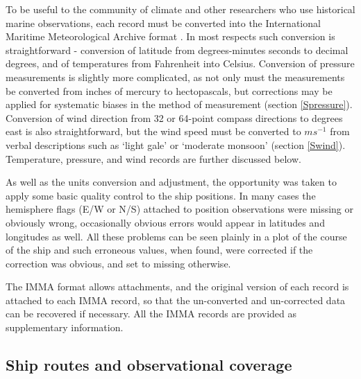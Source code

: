 \documentclass[CP]{copernicus}
\begin{document}
To be useful to the community of climate and other researchers who use historical marine observations, each record must be converted into the International Maritime Meteorological Archive format \citep{woodruff07imma}. In most respects such conversion is straightforward - conversion of latitude from degrees-minutes seconds to decimal degrees, and of temperatures from Fahrenheit into Celsius. Conversion of pressure measurements is slightly more complicated, as not only must the measurements be converted from inches of mercury to hectopascals, but corrections may be applied for systematic biases in the method of measurement (section \ref{Spressure}). Conversion of wind direction from 32 or 64-point compass directions to degrees east is also straightforward, but the wind speed must be converted to $ms^{-1}$ from verbal descriptions such as `light gale' or `moderate monsoon' (section \ref{Swind}). Temperature, pressure, and wind records are further discussed below.

As well as the units conversion and adjustment, the opportunity was taken to apply some basic quality control to the ship positions. In many cases the hemisphere flags (E/W or N/S) attached to position observations were missing or obviously wrong, occasionally obvious errors would appear in latitudes and longitudes as well. All these problems can be seen plainly in a plot of the course of the ship and such erroneous values, when found, were corrected if the correction was obvious, and set to missing otherwise. 

The IMMA format allows attachments, and the original version of each record is attached to each IMMA record, so that the un-converted and un-corrected data can be recovered if necessary. All the IMMA records are provided as supplementary information.

\subsection{Ship routes and observational coverage}
\end{document}
